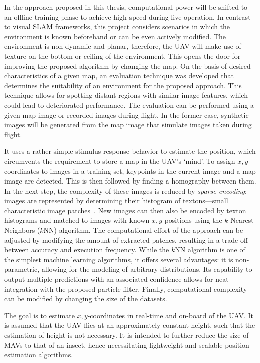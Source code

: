 \documentclass{report}
\begin{document}
In the approach proposed in this thesis, computational power will be
shifted to an offline training phase to achieve high-speed during live
operation. In contrast to visual SLAM frameworks, this project
considers scenarios in which the environment is known beforehand or
can be even actively modified. The environment is non-dynamic and
planar, therefore, the UAV will make use of texture on the bottom or
ceiling of the environment. This opens the door for improving the
proposed algorithm by changing the map. On the basis of desired
characteristics of a given map, an evaluation technique was developed
that determines the suitability of an environment for the proposed
approach. This technique allows for spotting distant regions with
similar image features, which could lead to deteriorated
performance. The evaluation can be performed using a given map image
or recorded images during flight. In the former case, synthetic images
will be generated from the map image that simulate images taken during
flight.

It uses a rather simple stimulus-response behavior to estimate the
position, which circumvents the requirement to store a map in the
UAV's `mind'. To assign $x,y$-coordinates to images in a training set,
keypoints in the current image and a map image are detected. This is
then followed by finding a homography between them. In the next step,
the complexity of these images is reduced by \emph{sparse encoding}:
images are represented by determining their histogram of
textons---small characteristic image
patches~\cite{varma2005statistical}.  New images can then also be
encoded by texton histograms and matched to images with known
$x,y$-positions using the $k$-Nearest Neighbors ($k$NN) algorithm. The
computational effort of the approach can be adjusted by modifying the
amount of extracted patches, resulting in a trade-off between accuracy
and execution frequency. While the $k$NN algorithm is one of the
simplest machine learning algorithms, it offers several advantages: it
is non-parametric, allowing for the modeling of arbitrary
distributions. Its capability to output multiple predictions with an
associated confidence allows for neat integration with the proposed
particle filter. Finally, computational complexity can be modified by
changing the size of the datasets.

The goal is to estimate $x,y$-coordinates in real-time and on-board of
the UAV. It is assumed that the UAV flies at an approximately constant
height, such that the estimation of height is not necessary.  It is
intended to further reduce the size of MAVs to that of an insect,
hence necessitating lightweight and scalable position estimation
algorithms.
\end{document}
